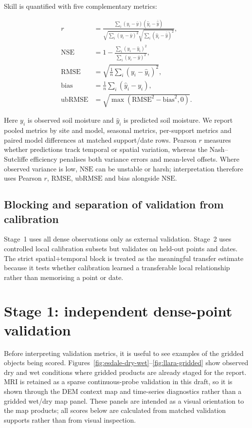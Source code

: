 \documentclass[11pt,a4paper]{article}
\newcommand{\nse}{\ensuremath{\mathrm{NSE}}}
\newcommand{\ubrmse}{\ensuremath{\mathrm{ubRMSE}}}
\newcommand{\pearsonr}{\ensuremath{r}}
\begin{document}
Skill is quantified with five complementary metrics:

\begin{align}
\pearsonr &= \frac{\sum_i (y_i - \bar{y})(\hat{y}_i - \bar{\hat{y}})}
  {\sqrt{\sum_i (y_i - \bar{y})^2}\sqrt{\sum_i(\hat{y}_i - \bar{\hat{y}})^2}}, \\
\nse &= 1 - \frac{\sum_i (y_i - \hat{y}_i)^2}
               {\sum_i (y_i - \bar{y})^2}, \\
\mathrm{RMSE} &= \sqrt{\frac{1}{n}\sum_i (y_i - \hat{y}_i)^2}, \\
\mathrm{bias} &= \frac{1}{n}\sum_i(\hat{y}_i - y_i), \\
\ubrmse &= \sqrt{\max(\mathrm{RMSE}^2 - \mathrm{bias}^2, 0)}.
\end{align}

Here $y_i$ is observed soil moisture and $\hat{y}_i$ is predicted soil
moisture.  We report pooled metrics by site and model, seasonal metrics,
per-support metrics and paired model differences at matched support/date rows.
Pearson $\pearsonr$ measures whether predictions track temporal or spatial
variation, whereas the Nash--Sutcliffe efficiency \citep[\nse;][]{nash1970river}
penalises both variance errors and mean-level offsets.  Where observed variance
is low, \nse{} can be unstable or harsh; interpretation therefore uses Pearson
$\pearsonr$, RMSE, \ubrmse{} and bias alongside \nse{}.

\subsection{Blocking and separation of validation from calibration}
\label{sec:blocking}

Stage~1 uses all dense observations only as external validation.  Stage~2 uses
controlled local calibration subsets but validates on held-out points and dates.
The strict spatial+temporal block is treated as the meaningful transfer
estimate because it tests whether calibration learned a transferable local
relationship rather than memorising a point or date.

\section{Stage 1: independent dense-point validation}\label{sec:stage1}

Before interpreting validation metrics, it is useful to see examples of
the gridded objects being scored.
Figures~\ref{fig:esdale-dry-wet}--\ref{fig:llara-gridded} show observed dry and wet
conditions where gridded products are already staged for the report.  MRI is
retained as a sparse continuous-probe validation in this draft, so it is shown
through the DEM context map and time-series diagnostics rather than a gridded
wet/dry map panel.  These panels are intended as a visual orientation to the map
products; all scores below are calculated from matched validation supports
rather than from visual inspection. 
\end{document}
